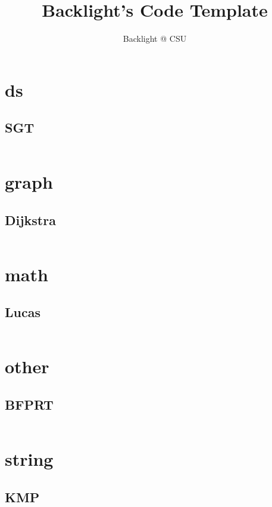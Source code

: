 \documentclass[a4]{article}
\title{\CJKfamily{hei} \bfseries Backlight's Code Template}
\author{Backlight @ CSU}
\begin{document}
\small
\begin{titlepage}
  \maketitle
\end{titlepage}

\newpage
\pagestyle{empty}
\renewcommand{\contentsname}{目录}
\tableofcontents
\newpage\clearpage
\newpage
\pagestyle{fancy}
\setcounter{page}{1}   %


\section{ds}
\subsection{SGT}
\inputminted[mathescape,linenos,numbersep=5pt,frame=lines,framesep=2mm]{cpp}{src/ds/SGTree.cpp}
\section{graph}
\subsection{Dijkstra}
\inputminted[mathescape,linenos,numbersep=5pt,frame=lines,framesep=2mm]{cpp}{src/graph/Dijkstra.cpp}
\section{math}
\subsection{Lucas}
\inputminted[mathescape,linenos,numbersep=5pt,frame=lines,framesep=2mm]{cpp}{src/math/Lucas.cpp}
\section{other}
\subsection{BFPRT}
\inputminted[mathescape,linenos,numbersep=5pt,frame=lines,framesep=2mm]{cpp}{src/other/BFPRT.cpp}
\section{string}
\subsection{KMP}
\inputminted[mathescape,linenos,numbersep=5pt,frame=lines,framesep=2mm]{cpp}{src/string/KMP.cpp}

\end{document}
